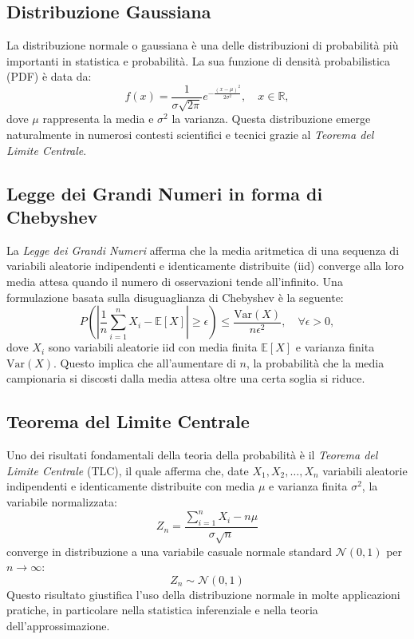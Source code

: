 \subsection{Distribuzione Gaussiana}
La distribuzione normale o gaussiana è una delle distribuzioni di probabilità più importanti 
in statistica e probabilità. La sua funzione di densità probabilistica (PDF) è data da:
\begin{equation}
    f(x) = \frac{1}{\sigma \sqrt{2\pi}} e^{-\frac{(x - \mu)^2}{2 \sigma^2}}, \quad x \in \mathbb{R},
\end{equation}
dove $\mu$ rappresenta la media e $\sigma^2$ la varianza.
Questa distribuzione emerge naturalmente in numerosi contesti scientifici e 
tecnici grazie al \textit{Teorema del Limite Centrale}.

\subsection{Legge dei Grandi Numeri in forma di Chebyshev}
La \textit{Legge dei Grandi Numeri} afferma che la media aritmetica di una sequenza di variabili aleatorie indipendenti
 e identicamente distribuite (iid) converge alla loro media attesa quando il numero di osservazioni tende all'infinito. 
 Una formulazione basata sulla disuguaglianza di Chebyshev è la seguente:
\begin{equation}
    P\left( \left| \frac{1}{n} \sum_{i=1}^{n} X_i - \mathbb{E}[X] \right| \geq \epsilon \right) \leq \frac{\text{Var}(X)}{n \epsilon^2}, \quad \forall \epsilon > 0,
    \label{eq:chebyshev}
\end{equation}
dove $X_i$ sono variabili aleatorie iid
con media finita $\mathbb{E}[X]$ e varianza finita $\text{Var}(X)$.
 Questo implica che all'aumentare di $n$, la probabilità che la media campionaria si discosti dalla media 
 attesa oltre una certa soglia si riduce.

\subsection{Teorema del Limite Centrale}
Uno dei risultati fondamentali della teoria della probabilità è il \textit{Teorema del Limite Centrale} (TLC), 
il quale afferma che, date $X_1, X_2, \dots, X_n$ variabili aleatorie indipendenti e identicamente distribuite 
con media $\mu$ e varianza finita $\sigma^2$, la variabile normalizzata:
\begin{equation}
    Z_n = \frac{\sum_{i=1}^{n} X_i - n\mu}{\sigma \sqrt{n}}
\end{equation}
converge in distribuzione a una variabile casuale normale standard $\mathcal{N}(0,1)$ per $n \to \infty$:
\begin{equation}
    Z_n \sim \mathcal{N}(0,1)
    \label{eq:tlc}
\end{equation}
Questo risultato giustifica l'uso della distribuzione normale in molte applicazioni pratiche, in particolare nella statistica inferenziale e nella teoria dell'approssimazione.